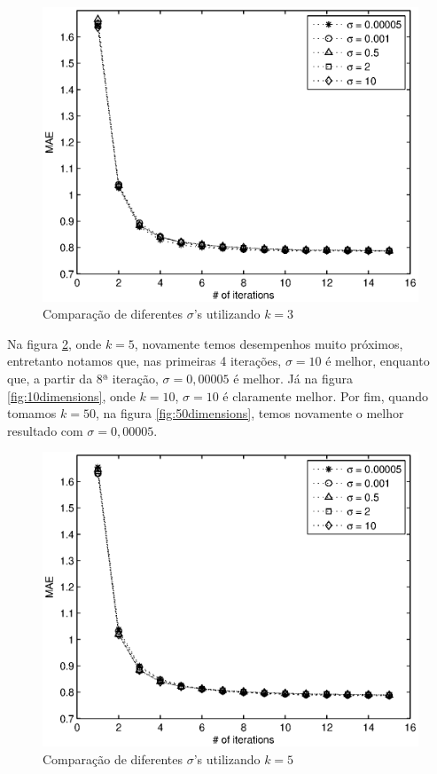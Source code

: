 \begin{figure}[ht]
\centering
\includegraphics{3dimensions.eps}
\caption{Comparação de diferentes $\sigma$'s utilizando $k=3$}
\label{fig:3dimensions}
\end{figure}

Na figura \ref{fig:5dimensions}, onde $k=5$, novamente temos desempenhos muito próximos, entretanto notamos que, nas primeiras 4 iterações, $\sigma=10$ é melhor, enquanto que, a partir da 8ª iteração, $\sigma=0,00005$ é melhor. Já na figura \ref{fig:10dimensions}, onde $k=10$, $\sigma=10$ é claramente melhor. Por fim, quando tomamos $k=50$, na figura \ref{fig:50dimensions}, temos novamente o melhor resultado com $\sigma=0,00005$.

\begin{figure}[ht]
\centering
\includegraphics{5dimensions.eps}
\caption{Comparação de diferentes $\sigma$'s utilizando $k=5$}
\label{fig:5dimensions}
\end{figure}

